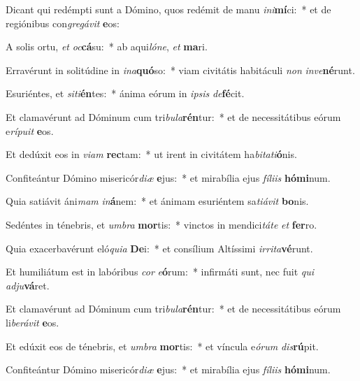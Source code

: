 \item Dicant qui redémpti sunt a Dómino, quos redémit de manu \textit{in}\textit{i}\textbf{mí}ci:~* et de regiónibus con\textit{gre}\textit{gá}\textit{vit} \textbf{e}os:
\item A solis ortu, \textit{et} \textit{oc}\textbf{cá}su:~* ab aqui\textit{ló}\textit{ne}, \textit{et} \textbf{ma}ri.
\item Erravérunt in solitúdine in \textit{in}\textit{a}\textbf{quó}so:~* viam civitátis habitáculi \textit{non} \textit{in}\textit{ve}\textbf{né}runt.
\item Esuriéntes, et \textit{si}\textit{ti}\textbf{én}tes:~* ánima eórum in \textit{ip}\textit{sis} \textit{de}\textbf{fé}cit.
\item Et clamavérunt ad Dóminum cum tri\textit{bu}\textit{la}\textbf{rén}tur:~* et de necessitátibus eórum e\textit{rí}\textit{pu}\textit{it} \textbf{e}os.
\item Et dedúxit eos in \textit{vi}\textit{am} \textbf{rec}tam:~* ut irent in civitátem ha\textit{bi}\textit{ta}\textit{ti}\textbf{ó}nis.
\item Confiteántur Dómino misericór\textit{di}\textit{æ} \textbf{e}jus:~* et mirabília ejus \textit{fí}\textit{li}\textit{is} \textbf{hó}\textbf{mi}num.
\item Quia satiávit áni\textit{mam} \textit{in}\textbf{á}nem:~* et ánimam esuriéntem sa\textit{ti}\textit{á}\textit{vit} \textbf{bo}nis.
\item Sedéntes in ténebris, et \textit{um}\textit{bra} \textbf{mor}tis:~* vinctos in mendici\textit{tá}\textit{te} \textit{et} \textbf{fer}ro.
\item Quia exacerbavérunt eló\textit{qui}\textit{a} \textbf{De}i:~* et consílium Altíssimi \textit{ir}\textit{ri}\textit{ta}\textbf{vé}runt.
\item Et humiliátum est in labóribus \textit{cor} \textit{e}\textbf{ó}rum:~* infirmáti sunt, nec fuit \textit{qui} \textit{ad}\textit{ju}\textbf{vá}ret.
\item Et clamavérunt ad Dóminum cum tri\textit{bu}\textit{la}\textbf{rén}tur:~* et de necessitátibus eórum li\textit{be}\textit{rá}\textit{vit} \textbf{e}os.
\item Et edúxit eos de ténebris, et \textit{um}\textit{bra} \textbf{mor}tis:~* et víncula e\textit{ó}\textit{rum} \textit{dis}\textbf{rú}pit.
\item Confiteántur Dómino misericór\textit{di}\textit{æ} \textbf{e}jus:~* et mirabília ejus \textit{fí}\textit{li}\textit{is} \textbf{hó}\textbf{mi}num.
